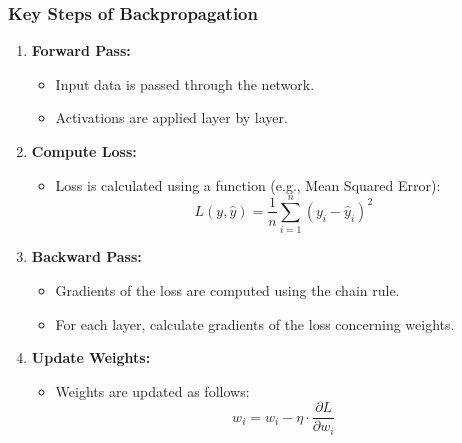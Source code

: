\documentclass[aspectratio=169]{beamer}
\begin{document}
\begin{frame}[fragile]
    \frametitle{Key Steps of Backpropagation}
    \begin{enumerate}
        \item \textbf{Forward Pass:}
        \begin{itemize}
            \item Input data is passed through the network.
            \item Activations are applied layer by layer.
        \end{itemize}
        
        \item \textbf{Compute Loss:}
        \begin{itemize}
            \item Loss is calculated using a function (e.g., Mean Squared Error):
            \begin{equation}
                L(y, \hat{y}) = \frac{1}{n} \sum_{i=1}^{n} (y_i - \hat{y}_i)^2
            \end{equation}
        \end{itemize}
        
        \item \textbf{Backward Pass:}
        \begin{itemize}
            \item Gradients of the loss are computed using the chain rule.
            \item For each layer, calculate gradients of the loss concerning weights.
        \end{itemize}
        
        \item \textbf{Update Weights:}
        \begin{itemize}
            \item Weights are updated as follows:
            \begin{equation}
                w_i = w_i - \eta \cdot \frac{\partial L}{\partial w_i}
            \end{equation}
        \end{itemize}
    \end{enumerate}
\end{frame}
\end{document}

